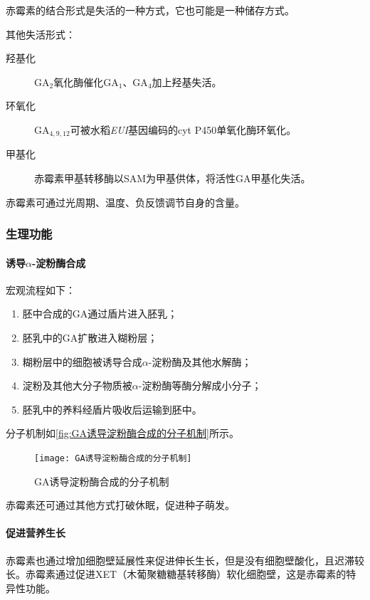 赤霉素的结合形式是失活的一种方式，它也可能是一种储存方式。

其他失活形式：

\begin{description}
	\item[羟基化] GA$_{2}$氧化酶催化GA$_{1}$、GA$_{4}$加上羟基失活。
	\item[环氧化] GA$_{4,9,12}$可被水稻\textit{EUI}基因编码的cyt P450单氧化酶环氧化。
	\item[甲基化] 赤霉素甲基转移酶以SAM为甲基供体，将活性GA甲基化失活。
\end{description}

赤霉素可通过光周期、温度、负反馈调节自身的含量。

\subsubsection{生理功能}

\paragraph{诱导$\alpha$-淀粉酶合成}

宏观流程如下：

\begin{enumerate}
	\item 胚中合成的GA通过盾片进入胚乳；
	\item 胚乳中的GA扩散进入糊粉层；
	\item 糊粉层中的细胞被诱导合成$\alpha$-淀粉酶及其他水解酶；
	\item 淀粉及其他大分子物质被$\alpha$-淀粉酶等酶分解成小分子；
	\item 胚乳中的养料经盾片吸收后运输到胚中。
\end{enumerate}

分子机制如\autoref{fig:GA诱导淀粉酶合成的分子机制}所示。

\begin{figure}[htbp]
	\centering
	\texttt{[image: GA诱导淀粉酶合成的分子机制]}
	\caption{GA诱导淀粉酶合成的分子机制}
	\label{fig:GA诱导淀粉酶合成的分子机制}
\end{figure}

赤霉素还可通过其他方式打破休眠，促进种子萌发。

\paragraph{促进营养生长}

赤霉素也通过增加细胞壁延展性来促进伸长生长，但是没有细胞壁酸化，且迟滞较长。赤霉素通过促进XET（木葡聚糖糖基转移酶）软化细胞壁，这是赤霉素的特异性功能。

